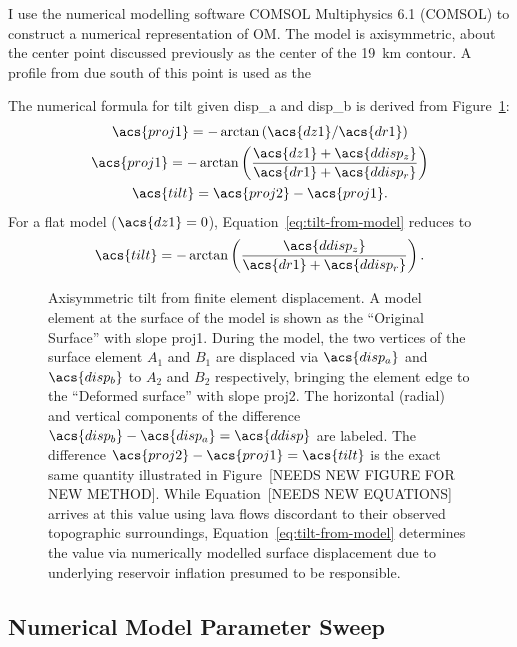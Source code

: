 I use the numerical modelling software COMSOL Multiphysics 6.1 (COMSOL) to construct a numerical representation of \acl{OM}. The model is axisymmetric, about the center point discussed previously as the center of the \qty{19}{\km} contour. A profile from due south of this point is used as the 

The numerical formula for \acf{tilt} given \acs{disp_a} and \acs{disp_b} is derived from Figure~\ref{fig:tilt-from-model}:
\begin{gather}
    \acs{proj1} = -\arctan\left({\acs{dz1}}/{\acs{dr1}}\right)\nonumber\\
    \acs{proj1} = -\arctan\left(\dfrac{\acs{dz1}+\acs{ddisp_z}}{\acs{dr1}+\acs{ddisp_r}}\right)\nonumber\\
    \acs{tilt} = \acs{proj2} - \acs{proj1}.\label{eq:tilt-from-model}
\end{gather}
For a flat model ($\acs{dz1} = 0$), Equation~\eqref{eq:tilt-from-model} reduces to
\begin{equation}
    \acs{tilt} = 
    -\arctan\left(\dfrac{\acs{ddisp_z}}{\acs{dr1}+\acs{ddisp_r}}\right).\label{eq:tilt-from-flat-model}
\end{equation}

\begin{figure}
    
    \caption[Calculation of \acf{tilt} from modelling]{Axisymmetric tilt from finite element displacement. A model element at the surface of the model is shown as the ``Original Surface'' with slope \acs{proj1}. During the model, the two vertices of the surface element $A_1$ and $B_1$ are displaced via $\acs{disp_a}$ and $\acs{disp_b}$ to $A_2$ and $B_2$ respectively, bringing the element edge to the ``Deformed surface'' with slope \acs{proj2}. The horizontal (radial) and vertical components of the difference $\acs{disp_b} - \acs{disp_a} = \acs{ddisp}$ are labeled. The difference $\acs{proj2}-\acs{proj1}=\acs{tilt}$ is the exact same quantity illustrated in Figure~[NEEDS NEW FIGURE FOR NEW METHOD]. While Equation~[NEEDS NEW EQUATIONS] arrives at this value using lava flows discordant to their observed topographic surroundings, Equation~\eqref{eq:tilt-from-model} determines the value via numerically modelled surface displacement due to underlying reservoir inflation presumed to be responsible.}%
    \label{fig:tilt-from-model}
\end{figure}

\subsection{Numerical Model Parameter Sweep}

